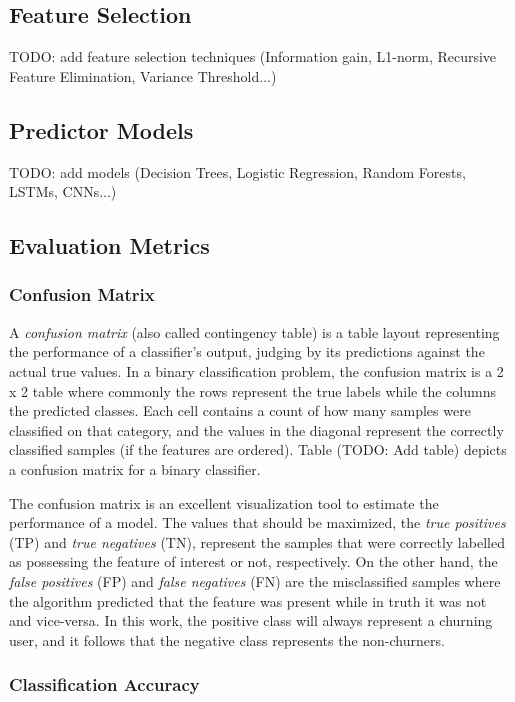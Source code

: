 \documentclass{kththesis}
\begin{document}
\subsection{Feature Selection}

TODO: add feature selection techniques (Information gain, L1-norm, Recursive Feature Elimination, Variance Threshold...)

\subsection{Predictor Models}

TODO: add models (Decision Trees, Logistic Regression, Random Forests, LSTMs, CNNs...)

\subsection{Evaluation Metrics}

\subsubsection{Confusion Matrix}

A \emph{confusion matrix} (also called contingency table) is a table layout representing the performance of a classifier's output, judging by its predictions against the actual true values. In a binary classification problem, the confusion matrix is a 2 x 2 table where commonly the rows represent the true labels while the columns the predicted classes. Each cell contains a count of how many samples were classified on that category, and the values in the diagonal represent the correctly classified samples (if the features are ordered). Table (TODO: Add table) depicts a confusion matrix for a binary classifier.

The confusion matrix is an excellent visualization tool to estimate the performance of a model. The values that should be maximized, the \emph{true positives} (TP) and \emph{true negatives} (TN), represent the samples that were correctly labelled as possessing the feature of interest or not, respectively. On the other hand, the \emph{false positives} (FP) and \emph{false negatives} (FN) are the misclassified samples where the algorithm predicted that the feature was present while in truth it was not and vice-versa. In this work, the positive class will always represent a churning user, and it follows that the negative class represents the non-churners.

\subsubsection{Classification Accuracy}
\end{document}

